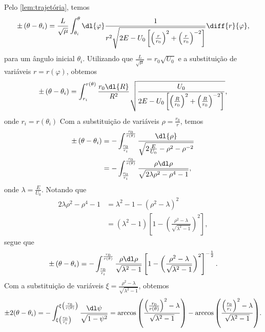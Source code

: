 Pelo \cref{lem:trajetória}, temos
\begin{equation}
    \pm\left(\theta - \theta_i\right) = \frac{L}{\sqrt\mu} \int_{\theta_i}^\theta\dl{\varphi} \frac{1}{r^2\sqrt{2E-U_0\left[\left(\frac{r}{r_0}\right)^2 + \left(\frac{r}{r_0}\right)^{-2}\right]}}\diff{r}{\varphi},
\end{equation}
para um ângulo inicial \(\theta_i\). Utilizando que \(\frac{L}{\sqrt{\mu}} = r_0\sqrt{U_0}\) e a substituição de variáveis \(r = r(\varphi)\), obtemos
\begin{equation}
\pm\left(\theta - \theta_i\right) = \int_{r_i}^{r(\theta)} \frac{r_0\dl{R}}{R^2} \sqrt{\frac{U_0}{2E-U_0\left[\left(\frac{R}{r_0}\right)^2 + \left(\frac{R}{r_0}\right)^{-2}\right]}},
\end{equation}
onde \(r_i = r(\theta_i)\)
Com a substituição de variáveis \(\rho = \frac{r_0}{r}\), temos
\begin{align}
    \pm\left(\theta - \theta_i\right) &= -\int_{\frac{r_0}{r_i}}^{\frac{r_0}{r(\theta)}} \frac{\dl{\rho}}{\sqrt{2\frac{E}{U_0} - \rho^2 - \rho^{-2}}}\\
                                      &= -\int_{\frac{r_0}{r_i}}^{\frac{r_0}{r(\theta)}} \frac{\rho\dl\rho}{\sqrt{2 \lambda \rho^2 - \rho^4 -1}},
\end{align}
onde \(\lambda = \frac{E}{U_0}\). Notando que
\begin{align}
    2 \lambda\rho^2 - \rho^4 - 1 &= \lambda^2 - 1 - \left(\rho^2 - \lambda\right)^2\\
                                 &= \left(\lambda^2 - 1\right)\left[1 - \left(\frac{\rho^2 - \lambda}{\sqrt{\lambda^2 - 1}}\right)^2\right],
\end{align}
segue que
\begin{equation}
    \pm\left(\theta - \theta_i\right) = - \int_{\frac{r_0}{r_i}}^{\frac{r_0}{r(\theta)}} \frac{\rho\dl\rho}{\sqrt{\lambda^2 - 1}}\left[1 - \left(\frac{\rho^2 - \lambda}{\sqrt{\lambda^2 - 1}}\right)^2\right]^{-\frac12}.
\end{equation}
Com a substituição de variáveis \(\xi = \frac{\rho^2 - \lambda}{\sqrt{\lambda^2 - 1}}\), obtemos
\begin{equation}
    \pm2(\theta - \theta_i) = -\int_{\xi\left(\frac{r_0}{r_i}\right)}^{\xi\left(\frac{r_0}{r(\theta)}\right)} \frac{\dl\psi}{\sqrt{1-\psi^2}} = \arccos{\left(\frac{\left(\frac{r_0}{r(\theta)}\right)^2-\lambda}{\sqrt{\lambda^2 - 1}}\right)} - \arccos{\left(\frac{\left(\frac{r_0}{r_i}\right)^2-\lambda}{\sqrt{\lambda^2 - 1}}\right)}.
\end{equation}

